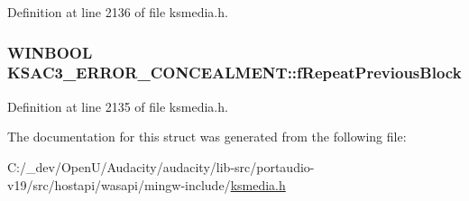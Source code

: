 Definition at line 2136 of file ksmedia.\+h.

\subsubsection[{\texorpdfstring{f\+Repeat\+Previous\+Block}{fRepeatPreviousBlock}}]{\setlength{\rightskip}{0pt plus 5cm}W\+I\+N\+B\+O\+OL K\+S\+A\+C3\+\_\+\+E\+R\+R\+O\+R\+\_\+\+C\+O\+N\+C\+E\+A\+L\+M\+E\+N\+T\+::f\+Repeat\+Previous\+Block}\hypertarget{struct_k_s_a_c3___e_r_r_o_r___c_o_n_c_e_a_l_m_e_n_t_a87223bc207eb1e67739cb015a59033ad}{}\label{struct_k_s_a_c3___e_r_r_o_r___c_o_n_c_e_a_l_m_e_n_t_a87223bc207eb1e67739cb015a59033ad}


Definition at line 2135 of file ksmedia.\+h.



The documentation for this struct was generated from the following file\+:\begin{DoxyCompactItemize}
\item 
C\+:/\+\_\+dev/\+Open\+U/\+Audacity/audacity/lib-\/src/portaudio-\/v19/src/hostapi/wasapi/mingw-\/include/\hyperlink{ksmedia_8h}{ksmedia.\+h}\end{DoxyCompactItemize}
